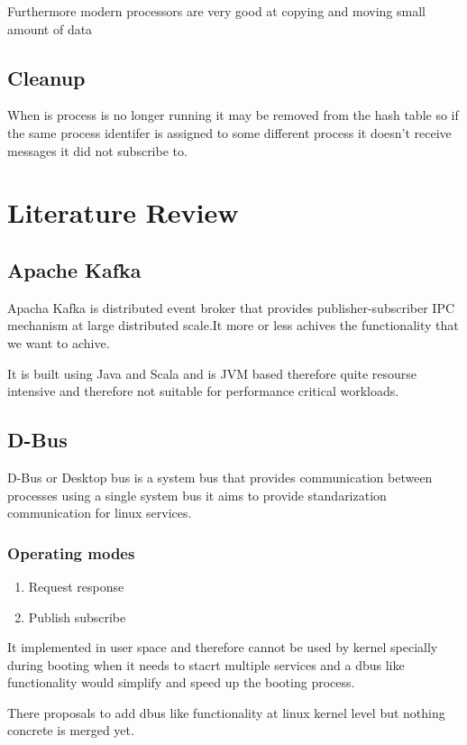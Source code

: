 \documentclass[12pt]{report}
\begin{document}
    Furthermore modern processors are very good at copying and moving
    small amount of data

	\section{Cleanup}
	When is process is no longer running it may be removed from the hash table
	so if the same process identifer is assigned to some different process it 
	doesn't receive messages it did not subscribe to.
    
	\chapter{Literature Review}
	\section{Apache Kafka}
	Apacha Kafka is distributed event broker that provides publisher-subscriber 
	IPC mechanism at large distributed scale.It more or less achives the functionality 
	that we want to achive.
	
	It is built using Java and Scala and is JVM based therefore quite resourse intensive
	and therefore not suitable for performance critical workloads.
	
	\section{D-Bus}
	D-Bus or Desktop bus is a system bus that provides communication between processes
	using a single system bus it aims to provide standarization communication for 
	linux services.
	
	\subsection{Operating modes} 
	\begin{enumerate}
		\item Request response
		\item Publish subscribe
	\end{enumerate} 
	
	It implemented in user space and therefore cannot be used by kernel specially during
	booting when it needs to stacrt multiple services and a dbus like functionality would
	simplify and speed up the booting process.
	
	There proposals to add dbus like functionality at linux kernel level but nothing
	concrete is merged yet\cite{citation03}.	
	
\end{document}
